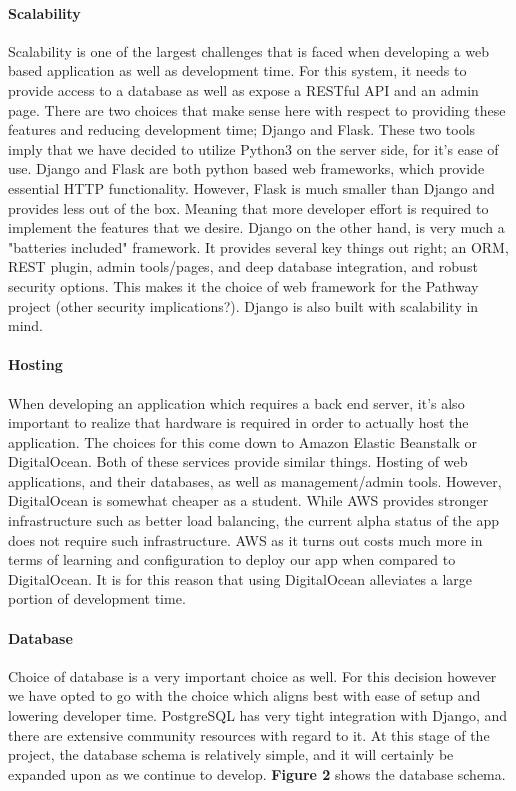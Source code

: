 \documentclass{article}
\begin{document}
\paragraph{Scalability}
Scalability is one of the largest challenges that is faced when developing a web based application
as well as development time. For this system, it needs to provide access to a database as well as
expose a RESTful API and an admin page. There are two choices that make sense here with respect to
providing these features and reducing development time; Django and Flask. These two tools imply that
we have decided to utilize Python3 on the server side, for it's ease of use. Django and Flask are
both python based web frameworks, which provide essential HTTP functionality. However, Flask is
much smaller than Django and provides less out of the box. Meaning that more developer effort is
required to implement the features that we desire. Django on the other hand, is very much a
"batteries included" framework. It provides several key things out right; an ORM, REST plugin,
admin tools/pages, and deep database integration, and robust security options. This makes it the
choice of web framework for the Pathway project (other security implications?). Django is also
built with scalability in mind.

\paragraph{Hosting}
When developing an application which requires a back end server, it's also important to realize that
hardware is required in order to actually host the application. The choices for this come down to
Amazon Elastic Beanstalk or DigitalOcean. Both of these services provide similar things. Hosting of
web applications, and their databases, as well as management/admin tools. However, DigitalOcean
is somewhat cheaper as a student. While AWS provides stronger infrastructure such as better
load balancing, the current alpha status of the app does not require such infrastructure.
AWS as it turns out costs much more in terms of learning and configuration to deploy our app
when compared to DigitalOcean. It is for this reason that using DigitalOcean alleviates a large
portion of development time.

\paragraph{Database}
Choice of database is a very important choice as well. For this decision however we have opted to
go with the choice which aligns best with ease of setup and lowering developer time. PostgreSQL
has very tight integration with Django, and there are extensive community resources with regard to
it. At this stage of the project, the database schema is relatively simple, and it will certainly
be expanded upon as we continue to develop. \textbf{Figure 2} shows the database schema.
\end{document}
